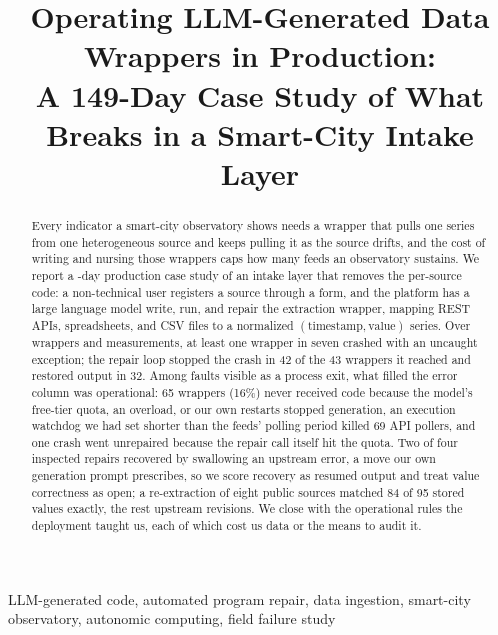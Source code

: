 \documentclass[conference]{IEEEtran}
\begin{document}
\title{Operating LLM-Generated Data Wrappers in Production:\\
A 149-Day Case Study of What Breaks in a Smart-City Intake Layer}

\author{
}

\maketitle

\begin{abstract}
Every indicator a smart-city observatory shows needs a wrapper that pulls one series
from one heterogeneous source and keeps pulling it as the source drifts, and the cost
of writing and nursing those wrappers caps how many feeds an observatory sustains. We
report a \deploymentDays{}-day production case study of an intake layer that removes
the per-source code: a non-technical user registers a source through a form, and the
platform has a large language model write, run, and repair the extraction wrapper,
mapping REST APIs, spreadsheets, and CSV files to a normalized
$(\textrm{timestamp}, \textrm{value})$ series. Over \nWrappers{} wrappers and
\nDataPoints{} measurements, at least one wrapper in seven crashed with an uncaught
exception; the repair loop stopped the crash in 42 of the 43 wrappers it reached and
restored output in 32. Among faults visible as a process exit, what filled the
error column was operational: 65 wrappers
(16\%) never received code because the model's free-tier quota, an overload, or our
own restarts stopped generation, an execution watchdog we had set shorter than the
feeds' polling period killed 69 API pollers, and one crash went unrepaired because the
repair call itself hit the quota. Two of four inspected repairs recovered by
swallowing an upstream error, a move our own generation prompt prescribes, so we score
recovery as resumed output and treat value correctness as open; a re-extraction of
eight public sources matched 84 of 95 stored values exactly, the rest upstream
revisions. We close with the operational rules the deployment taught us, each of
which cost us data or the means to audit it.
\end{abstract}

\begin{IEEEkeywords}
LLM-generated code, automated program repair, data ingestion, smart-city
observatory, autonomic computing, field failure study
\end{IEEEkeywords}
\end{document}
